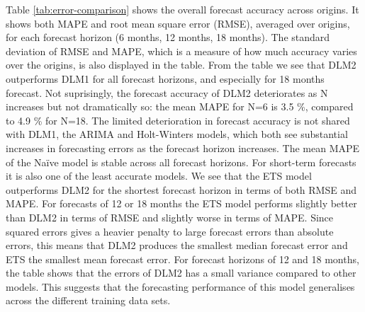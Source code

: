 \documentclass[12pt, a4paper]{article}
\begin{document}
Table \ref{tab:error-comparison} shows the overall forecast accuracy across origins.
It shows both MAPE and root mean square error (RMSE), averaged over origins, for each forecast horizon (6 months, 12 months, 18 months). The standard deviation of RMSE and MAPE, which is a measure of how much accuracy varies over the origins, is also displayed in the table. From the table we see that DLM2 outperforms DLM1 for all forecast horizons, and especially for 18 months forecast. Not suprisingly, the forecast accuracy of DLM2 deteriorates as N increases but not dramatically so: the mean
MAPE for N=6 is 3.5 \%, compared to 4.9 \% for N=18. The limited
deterioration in forecast accuracy is not shared with DLM1, the ARIMA and
Holt-Winters models, which both see substantial increases in forecasting
errors as the forecast horizon increases. The mean MAPE of the Naïve
model is stable across all forecast horizons. For short-term forecasts it is also one of the least accurate models. We see that the ETS model outperforms
DLM2 for the shortest forecast horizon in terms of both RMSE and MAPE.
For forecasts of 12 or 18 months the ETS model performs slightly better
than DLM2 in terms of RMSE and slightly worse in terms of MAPE. Since
squared errors gives a heavier penalty to large forecast errors than
absolute errors, this means that DLM2 produces the smallest median
forecast error and ETS the smallest mean forecast error. For forecast horizons of 12 and 18 months, the table shows that the errors of DLM2 has a small variance compared to other models. This suggests that the forecasting performance of this model generalises across the different training data sets. 
\end{document}
